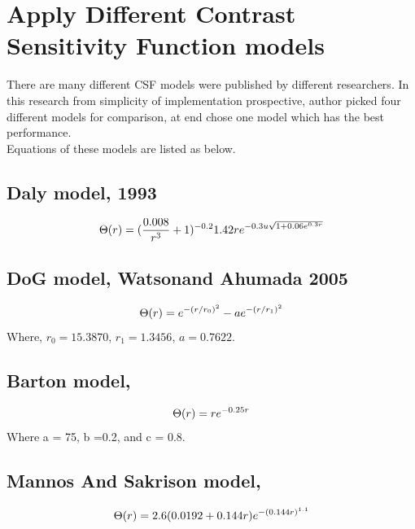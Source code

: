\documentclass{article}
\begin{document}
\section{Apply Different Contrast Sensitivity Function models}
There are many different CSF models were published by different researchers. In this research from simplicity of implementation prospective, author picked four different models for comparison, at end chose one model which has the best performance.\\
Equations of these models are listed as below.
\subsection{Daly model, 1993\cite{UseCSFinFusedIMage}}
\begin{equation}
    \centering
    \label{eq:daly}
     \Theta(r) = (\frac{0.008}{r^3}+1)^{-0.2}1.42re^{-0.3u\sqrt{1+0.06e^{0.3r}}}
\end{equation}
\subsection{DoG model, Watsonand Ahumada 2005\cite{Standard-Model-Contrast}}
\begin{equation}
    \centering
    \label{eq:DoG}
     \Theta(r) = e^{-(r/r_0)^2}-ae^{-(r/r_1)^2}
\end{equation}
Where, $r_0 = 15.3870$, $r_1 = 1.3456$, $a = 0.7622$.
\subsection{Barton model, \cite{AssessmentAlgoImageFusion}}
\begin{equation}
    \centering
    \label{eq:mannos}
     \Theta(r) = re^{-0.25r}
\end{equation}
Where a = 75, b =0.2, and c = 0.8. 
\subsection{Mannos And Sakrison model,\cite{Mannos-Sakrison}}
\begin{equation}
    \centering
    \label{eq:mannos}
     \Theta(r) = 2.6(0.0192+0.144r)e^{-(0.144r)^{1.1}}
\end{equation}
\end{document}
